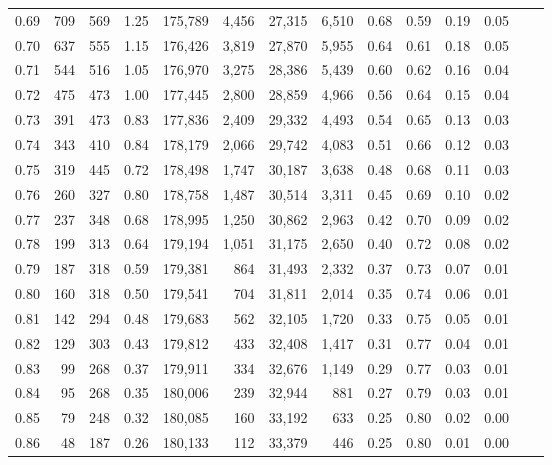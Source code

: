 \begin{tabular}{rrrrrrrrrrrrrr}
0.69 &    709 &  569 &    1.25 &  175,789 &    4,456 &  27,315 &   6,510 &  0.68 &  0.59 &  0.19 &      0.05 \\
0.70 &    637 &  555 &    1.15 &  176,426 &    3,819 &  27,870 &   5,955 &  0.64 &  0.61 &  0.18 &      0.05 \\
0.71 &    544 &  516 &    1.05 &  176,970 &    3,275 &  28,386 &   5,439 &  0.60 &  0.62 &  0.16 &      0.04 \\
0.72 &    475 &  473 &    1.00 &  177,445 &    2,800 &  28,859 &   4,966 &  0.56 &  0.64 &  0.15 &      0.04 \\
0.73 &    391 &  473 &    0.83 &  177,836 &    2,409 &  29,332 &   4,493 &  0.54 &  0.65 &  0.13 &      0.03 \\
0.74 &    343 &  410 &    0.84 &  178,179 &    2,066 &  29,742 &   4,083 &  0.51 &  0.66 &  0.12 &      0.03 \\
0.75 &    319 &  445 &    0.72 &  178,498 &    1,747 &  30,187 &   3,638 &  0.48 &  0.68 &  0.11 &      0.03 \\
0.76 &    260 &  327 &    0.80 &  178,758 &    1,487 &  30,514 &   3,311 &  0.45 &  0.69 &  0.10 &      0.02 \\
0.77 &    237 &  348 &    0.68 &  178,995 &    1,250 &  30,862 &   2,963 &  0.42 &  0.70 &  0.09 &      0.02 \\
0.78 &    199 &  313 &    0.64 &  179,194 &    1,051 &  31,175 &   2,650 &  0.40 &  0.72 &  0.08 &      0.02 \\
0.79 &    187 &  318 &    0.59 &  179,381 &      864 &  31,493 &   2,332 &  0.37 &  0.73 &  0.07 &      0.01 \\
0.80 &    160 &  318 &    0.50 &  179,541 &      704 &  31,811 &   2,014 &  0.35 &  0.74 &  0.06 &      0.01 \\
0.81 &    142 &  294 &    0.48 &  179,683 &      562 &  32,105 &   1,720 &  0.33 &  0.75 &  0.05 &      0.01 \\
0.82 &    129 &  303 &    0.43 &  179,812 &      433 &  32,408 &   1,417 &  0.31 &  0.77 &  0.04 &      0.01 \\
0.83 &     99 &  268 &    0.37 &  179,911 &      334 &  32,676 &   1,149 &  0.29 &  0.77 &  0.03 &      0.01 \\
0.84 &     95 &  268 &    0.35 &  180,006 &      239 &  32,944 &     881 &  0.27 &  0.79 &  0.03 &      0.01 \\
0.85 &     79 &  248 &    0.32 &  180,085 &      160 &  33,192 &     633 &  0.25 &  0.80 &  0.02 &      0.00 \\
0.86 &     48 &  187 &    0.26 &  180,133 &      112 &  33,379 &     446 &  0.25 &  0.80 &  0.01 &      0.00 \\

\end{tabular}
